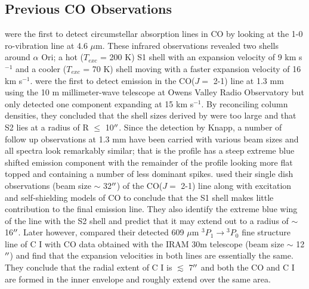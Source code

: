 \documentclass[apj]{emulateapj}
\begin{document}
\subsection{Previous CO Observations}
\cite{1979ApJ...233L.135B} were the first to detect circumstellar absorption lines in CO by looking at the 1-0 ro-vibration line at 4.6 $\mu$m. These infrared observations revealed two shells around $\alpha$ Ori; a hot (\rm{$T_{exc}$} = 200 K) S1 shell with an expansion velocity of 9 km s${}^{-1}$ and a cooler (\rm{$T_{exc}$} = 70 K) shell moving with a faster expansion velocity of 16 km s${}^{-1}$.   \cite{1980ApJ...242L..25K} were the first to detect emission in the CO($J=$ 2-1) line at 1.3 mm using the 10 m millimeter-wave telescope at Owens Valley Radio Observatory but only detected one component expanding at 15 km s${}^{-1}$. By reconciling column densities, they concluded that the shell sizes derived by \cite{1979ApJ...233L.135B} were too large and that S2 lies at a radius of R $\leq$ 10$\mbox{$^{\prime\prime}$}$. Since the detection by Knapp, a number of follow up observations at 1.3 mm have been carried with various beam sizes and all spectra look remarkably similar; that is the profile has a steep extreme blue shifted emission component with the remainder of the profile looking more flat topped and containing a number of less dominant spikes. \cite{1987ApJ...313..400H} used their single dish observations (beam size $\sim$ 32$\mbox{$^{\prime\prime}$}$) of the CO($J=$ 2-1) line along with excitation and self-shielding models of CO to conclude that the S1 shell makes little contribution to the final emission line. They also identify the extreme blue wing of the line with the S2 shell and predict that it may extend out to a radius of $\sim$ 16$\mbox{$^{\prime\prime}$}$. Later however, \cite{1994ApJ...424L.127H} compared their detected 609 $\mu$m ${}^3P{}_1\rightarrow{}^3P{}_0$ fine structure line of C I with CO data obtained with the IRAM 30m telescope (beam size $\sim$ 12$\mbox{$^{\prime\prime}$}$) and find that the expansion velocities in both lines are essentially the same. They conclude that the radial extent of C I is $\lesssim$ 7$\mbox{$^{\prime\prime}$}$ and both the CO and C I are formed in the inner envelope and roughly extend over the same area.  
\end{document}
